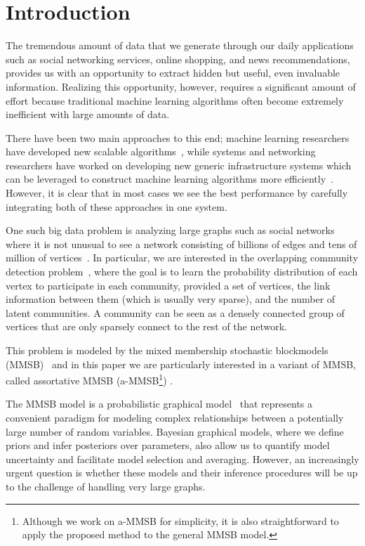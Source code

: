 \section{Introduction}
The tremendous amount of data that we generate through our daily applications such as social networking services, online shopping, and news recommendations, provides us with an opportunity to extract hidden but useful, even invaluable information. Realizing this opportunity, however, requires a significant amount of effort because traditional machine learning algorithms often become extremely inefficient with large amounts of data.

There have been two main approaches to this end; machine learning researchers have developed new scalable algorithms~\cite{bottou2010large, boyd2011distributed}, while systems and networking researchers have worked on developing new generic infrastructure systems which can be leveraged to construct machine learning algorithms more efficiently~\cite{dean2008mapreduce, chang2008bigtable}. However, it is clear that in most cases we see the best performance by carefully integrating both of these approaches in one system.

One such big data problem is analyzing large graphs such as social networks where it is not unusual to see a network consisting of billions of edges and tens of million of vertices~\cite{yang2015defining}. In particular, we are interested in the overlapping community detection problem~\cite{xie2013overlapping}, where the goal is to learn the probability distribution of each vertex to participate in each community, provided a set of vertices, the link information between them (which is usually very sparse), and the number of latent communities. A community can be seen as a densely connected group of vertices that are only sparsely connect to the rest of the network. 

This problem is modeled by the mixed membership stochastic blockmodels (MMSB)~\cite{airoldi2009mixed} and in this paper we are particularly interested in a variant of MMSB, called assortative MMSB (a-MMSB\footnote{Although we work on a-MMSB for simplicity, it is also straightforward to apply the proposed method to the general MMSB model.}) \cite{gopalan2012scalable}.

The MMSB model is a probabilistic graphical model~\cite{koller2009probabilistic} that represents a convenient paradigm for modeling complex relationships between a potentially large number of random variables. Bayesian graphical models, where we define priors and infer posteriors over parameters, also allow us to quantify model uncertainty and facilitate model selection and averaging. However, an increasingly urgent question is whether these models and their inference procedures will be up to the challenge of handling very large graphs.

